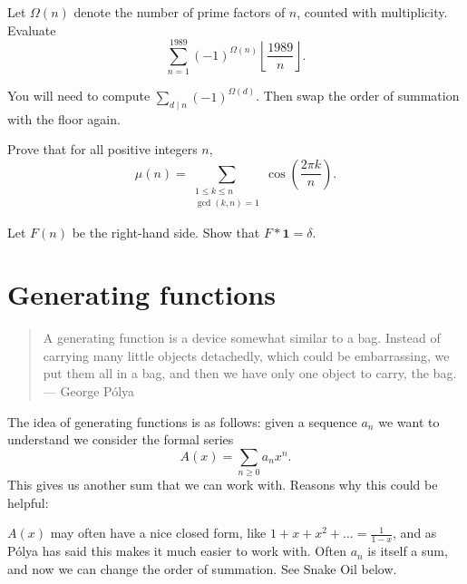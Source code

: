 \documentclass[11pt]{scrartcl}
\begin{document}
\begin{problem}
	[Bulgaria 1989]
	Let $\Omega(n)$ denote the number of prime factors of $n$,
	counted with multiplicity. Evaluate
	\[ \sum_{n=1}^{1989} (-1)^{\Omega(n)}
		\left\lfloor \frac{1989}{n} \right\rfloor.  \]
	\begin{hint}
		You will need to compute $\sum_{d \mid n} (-1)^{\Omega(d)}$.
		Then swap the order of summation with the floor again.
	\end{hint}
\end{problem}

\begin{problem}
	Prove that for all positive integers $n$,
	\[
		\mu(n)
		= \sum_{\substack{1 \le k \le n \\ \gcd(k,n)=1}}
		\cos\left( \frac{2\pi k}{n} \right).
	\]
	\begin{hint}
		Let $F(n)$ be the right-hand side.
		Show that $F \ast \mathbf 1 = \delta$.
	\end{hint}
\end{problem}

\section{Generating functions}
\begin{quote}
	A generating function is a device somewhat similar to a bag. Instead of carrying many little objects detachedly, which could be embarrassing, we put them all in a bag, and then we have only one object to carry, the bag. \\ --- George P\'olya
\end{quote}

The idea of generating functions is as follows:
given a sequence $a_n$ we want to understand
we consider the formal series
\[ A(x) = \sum_{n \ge 0} a_n x^n. \]
This gives us another sum that we can work with.
Reasons why this could be helpful:
\begin{itemize}
	\ii $A(x)$ may often have a nice closed form,
	like $1 + x + x^2 + \dots = \frac{1}{1-x}$,
	and as P\'olya has said this makes it much easier to work with.
	\ii Often $a_n$ is itself a sum,
	and now we can change the order of summation.
	See Snake Oil below.
\end{itemize}
\end{document}
